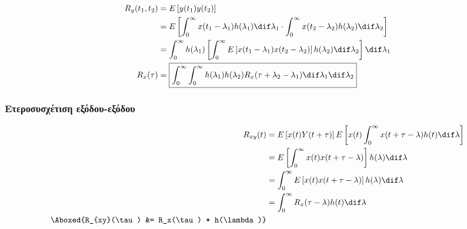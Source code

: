\documentclass[11pt,a4paper,notitlepage,fleqn,final]{article}
\begin{document}
\begin{align*}
	R_y(t_1,t_2) &= E\left[y(t_1)y(t_2)\right]
	\\ &= E\left[\int_{0}^{\infty}
	x(t_1-\lambda_1)h(\lambda_1)\dif\lambda_1
	\cdot
	\int_{0}^{\infty} x(t_2-\lambda_2)h(\lambda_2)\dif\lambda_2
	\right]
	\\ &= \int_{0}^{\infty}
	h(\lambda_1)\left[\int_{0}^{\infty}
	E\left[x(t_1-\lambda_1)x(t_2-\lambda_2)
	\right]h(\lambda_2)\dif\lambda_2
	\right]\dif\lambda_1 \\
	R_x(\tau) &= \boxed{
	    \int_{0}^{\infty}
	    \int_{0}^{\infty}
	    h(\lambda_1)h(\lambda_2)
	    R_x(\tau+\lambda_2-\lambda_1)\dif\lambda_1\dif\lambda_2
    }
\end{align*}

\subsubsection{Ετεροσυσχέτιση εξόδου-εξόδου}
\begin{align*}
	R_{xy}(t) &= E\left[x(t)Y(t+\tau)\right]
	E\left[x(t)
	\int_{0}^{\infty} x(t+\tau - \lambda)h(t)\dif\lambda
	\right]
	\\ &= E\left[
	\int_{0}^{\infty} x(t) x(t+\tau-\lambda)
	\right] h(\lambda)\dif\lambda
	\\ &= \int_{0}^{\infty} E\left[
	x(t)x(t+\tau - \lambda)
	\right] h(\lambda) \dif\lambda
	\\ &= \int_{0}^{\infty}
	R_x (\tau - \lambda)h(t)\dif\lambda
	\\
	\Aboxed{R_{xy}(\tau) &= R_x(\tau) * h(\lambda)}
\end{align*}
\end{document}
